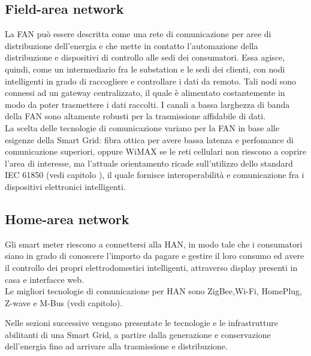 \subsection{Field-area network}
La FAN può essere descritta come una rete di comunicazione per aree di distribuzione dell'energia e che mette in contatto l'automazione della distribuzione e dispositivi di controllo alle sedi dei consumatori. Essa agisce, quindi, come un intermediario fra le substation e le sedi dei clienti, con nodi intelligenti in grado di raccogliere e controllare i dati da remoto. Tali nodi sono connessi ad un gateway centralizzato, il quale è alimentato costantemente in modo da poter trasmettere i dati raccolti. I canali a bassa larghezza di banda della FAN sono altamente robusti per la trasmissione affidabile di dati. 
\\ 
La scelta delle tecnologie di comunicazione  variano per la FAN in base alle esigenze della Smart Grid: fibra ottica per avere bassa latenza e perfomance di comunicazione superiori, oppure WiMAX se le reti cellulari non riescono a coprire l'area di interesse, ma l'attuale orientamento ricade sull'utilizzo dello standard IEC 61850 (vedi capitolo ), il quale fornisce interoperabilità e comunicazione fra i dispositivi elettronici intelligenti.

\subsection{Home-area network}{
Gli smart meter riescono a connettersi alla HAN, in modo tale che i consumatori siano in grado di conoscere l'importo da pagare e gestire il loro consumo ed avere il controllo dei propri elettrodomestici intelligenti, attraverso display presenti in casa e interfacce web. 
\\ 
Le migliori tecnologie di comunicazione per HAN sono ZigBee,Wi-Fi, HomePlug, Z-wave e M-Bus (vedi capitolo).
}

\vspace{20pt}\hspace{-17pt}Nelle sezioni successive vengono presentate le tecnologie e le infrastrutture abilitanti di una Smart Grid, a partire dalla generazione e conservazione dell'energia fino ad arrivare alla trasmissione e distribuzione.

